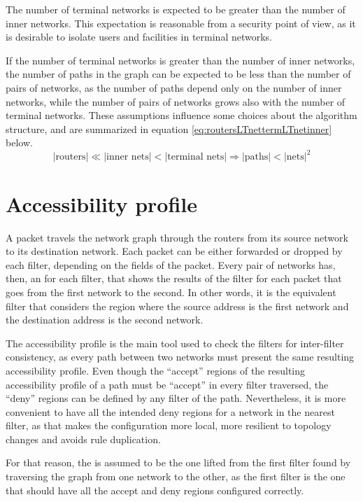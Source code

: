 The number of terminal networks is expected to be greater than the number of
inner networks. This expectation is reasonable from a security point of view, as
it is desirable to isolate users and facilities in terminal networks.

If the number of terminal networks is greater than the number of inner networks, the
number of paths in the graph can be expected to be less than the number of pairs
of networks, as the number of paths depend only on the number of inner networks,
while the number of pairs of networks grows also with the number of terminal
networks. These assumptions influence some choices about the algorithm
structure, and are summarized in equation \ref{eq:routersLTnettermLTnetinner}
below.
\begin{equation}
	\label{eq:routersLTnettermLTnetinner}
	|\mbox{routers}| \ll |\mbox{inner nets}| < |\mbox{terminal nets}|
	\Rightarrow
	|\mbox{paths}| < |\mbox{nets}|^2
\end{equation}



\section{Accessibility profile}

A packet travels the network graph through the routers from its source network
to its destination network. Each packet can be either forwarded or dropped by each
filter, depending on the fields of the packet. Every pair of networks has, then,
an  for each filter, that shows the results of the
filter for each packet that goes from the first network to the second. In other
words, it is the equivalent filter that considers the region where the source
address is the first network and the destination address is the second network.

The accessibility profile is the main tool used to check the filters for
inter-filter consistency, as every path between two networks must present the
same resulting accessibility profile. Even though the ``accept'' regions of
the resulting accessibility profile of a path must be ``accept'' in every filter
traversed, the ``deny'' regions can be defined by any filter of the path.
Nevertheless, it is more convenient to have all the intended deny regions for a
network in the nearest filter, as that makes the configuration more local, more
resilient to topology changes and avoids rule duplication.

For that reason, the  is
assumed to be the one lifted from the first filter found by traversing the graph
from one network to the other, as the first filter is the one that should have all the
accept and deny regions configured correctly.



